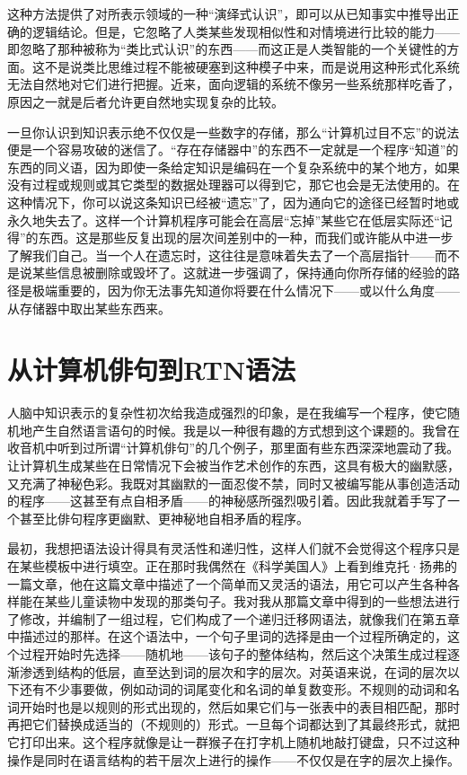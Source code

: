 这种方法提供了对所表示领域的一种“演绎式认识”，即可以从已知事实中推导出正确的逻辑结论。但是，它忽略了人类某些发现相似性和对情境进行比较的能力——即忽略了那种被称为“类比式认识”的东西——而这正是人类智能的一个关键性的方面。这不是说类比思维过程不能被硬塞到这种模子中来，而是说用这种形式化系统无法自然地对它们进行把握。近来，面向逻辑的系统不像另一些系统那样吃香了，原因之一就是后者允许更自然地实现复杂的比较。

一旦你认识到知识表示绝不仅仅是一些数字的存储，那么“计算机过目不忘”的说法便是一个容易攻破的迷信了。“存在存储器中”的东西不一定就是一个程序“知道”的东西的同义语，因为即使一条给定知识是编码在一个复杂系统中的某个地方，如果没有过程或规则或其它类型的数据处理器可以得到它，那它也会是无法使用的。在这种情况下，你可以说这条知识已经被“遗忘”了，因为通向它的途径已经暂时地或永久地失去了。这样一个计算机程序可能会在高层“忘掉”某些它在低层实际还“记得”的东西。这是那些反复出现的层次间差别中的一种，而我们或许能从中进一步了解我们自己。当一个人在遗忘时，这往往是意味着失去了一个高层指针——而不是说某些信息被删除或毁坏了。这就进一步强调了，保持通向你所存储的经验的路径是极端重要的，因为你无法事先知道你将要在什么情况下——或以什么角度——从存储器中取出某些东西来。

\section{从计算机俳句到RTN语法}

人脑中知识表示的复杂性初次给我造成强烈的印象，是在我编写一个程序，使它随机地产生自然语言语句的时候。我是以一种很有趣的方式想到这个课题的。我曾在收音机中听到过所谓“计算机俳句”的几个例子，那里面有些东西深深地震动了我。让计算机生成某些在日常情况下会被当作艺术创作的东西，这具有极大的幽默感，又充满了神秘色彩。我既对其幽默的一面忍俊不禁，同时又被编写能从事创造活动的程序——这甚至有点自相矛盾——的神秘感所强烈吸引着。因此我就着手写了一个甚至比俳句程序更幽默、更神秘地自相矛盾的程序。

最初，我想把语法设计得具有灵活性和递归性，这样人们就不会觉得这个程序只是在某些模板中进行填空。正在那时我偶然在《科学美国人》上看到维克托·扬弗的一篇文章，他在这篇文章中描述了一个简单而又灵活的语法，用它可以产生各种各样能在某些儿童读物中发现的那类句子。我对我从那篇文章中得到的一些想法进行了修改，并编制了一组过程，它们构成了一个递归迁移网语法，就像我们在第五章中描述过的那样。在这个语法中，一个句子里词的选择是由一个过程所确定的，这个过程开始时先选择——随机地——该句子的整体结构，然后这个决策生成过程逐渐渗透到结构的低层，直至达到词的层次和字的层次。对英语来说，在词的层次以下还有不少事要做，例如动词的词尾变化和名词的单复数变形。不规则的动词和名词开始时也是以规则的形式出现的，然后如果它们与一张表中的表目相匹配，那时再把它们替换成适当的（不规则的）形式。一旦每个词都达到了其最终形式，就把它打印出来。这个程序就像是让一群猴子在打字机上随机地敲打键盘，只不过这种操作是同时在语言结构的若干层次上进行的操作——不仅仅是在字的层次上操作。

